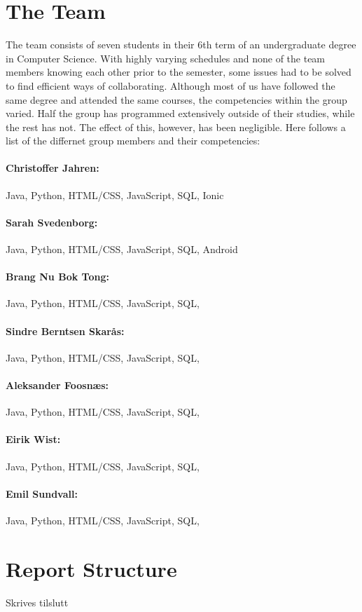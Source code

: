 \section{The Team}
The team consists of seven students in their 6th term of an undergraduate degree in Computer Science. With highly varying schedules and none of the team members knowing each other prior to the semester, some issues had to be solved to find efficient ways of collaborating. Although most of us have followed the same degree and attended the same courses, the competencies within the group varied. Half the group has programmed extensively outside of their studies, while the rest has not. The effect of this, however, has been negligible. Here follows a list of the differnet group members and their competencies:

\paragraph*{Christoffer Jahren:} Java, Python, HTML/CSS, JavaScript, SQL, Ionic
\paragraph*{Sarah Svedenborg:} Java, Python, HTML/CSS, JavaScript, SQL, Android
\paragraph*{Brang Nu Bok Tong:} Java, Python, HTML/CSS, JavaScript, SQL,
\paragraph*{Sindre Berntsen Skarås:} Java, Python, HTML/CSS, JavaScript, SQL,
\paragraph*{Aleksander Foosnæs:} Java, Python, HTML/CSS, JavaScript, SQL,
\paragraph*{Eirik Wist:} Java, Python, HTML/CSS, JavaScript, SQL,
\paragraph*{Emil Sundvall:} Java, Python, HTML/CSS, JavaScript, SQL,



\section{Report Structure}
Skrives tilslutt